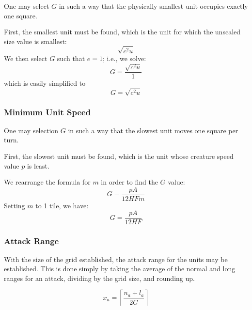 One may select $G$ in such a way that the physically smallest unit
occupies exactly one square.

First, the smallest unit must be found,
which is the unit for which the unscaled size value is smallest:
\[
    \sqrt{c^2 u}
\]
We then select $G$ such that $e = 1$;
i.e., we solve:
\[
    G = \frac
            {\sqrt{c^2 u}}
            {1}
\]
which is easily simplified to
\[
    G = \sqrt{c^2 u}
\]

\subsubsection{Minimum Unit Speed}

One may selection $G$ in such a way that the slowest unit moves one square per turn.

First, the slowest unit must be found,
which is the unit whose creature speed value $p$ is least.

We rearrange the formula for $m$ in order to find the $G$ value:
\[
    G = \frac
            {p A}
            {12 H F m}
\]
Setting $m$ to 1 tile, we have:
\[
    G = \frac
            {p A}
            {12 H F}
\]

\subsubsection{Attack Range}

With the size of the grid established, the attack range for the units may be established.
This is done simply by taking the average of the normal and long ranges for an attack,
dividing by the grid size,
and rounding up.

\[
    x_a = \left\lceil\frac
        {n_a + l_a}
        {2 G}
        \right\rceil
\]

